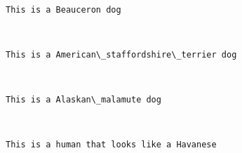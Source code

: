\documentclass[11pt]{article}
\begin{document}
    \begin{center}
    \end{center}
    { \hspace*{\fill} \\}
    
    \begin{Verbatim}[commandchars=\\\{\}]
This is a Beauceron dog

    \end{Verbatim}

    \begin{center}
    \end{center}
    { \hspace*{\fill} \\}
    
    \begin{Verbatim}[commandchars=\\\{\}]
This is a American\_staffordshire\_terrier dog

    \end{Verbatim}

    \begin{center}
    \end{center}
    { \hspace*{\fill} \\}
    
    \begin{Verbatim}[commandchars=\\\{\}]
This is a Alaskan\_malamute dog

    \end{Verbatim}

    \begin{center}
    \end{center}
    { \hspace*{\fill} \\}
    
    \begin{Verbatim}[commandchars=\\\{\}]
This is a human that looks like a Havanese

    \end{Verbatim}

    \begin{center}
    \end{center}
    { \hspace*{\fill} \\}
    
\end{document}
